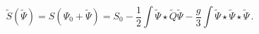 \begin{equation}
\tilde{S} (\tilde{\Psi}) = S (\Psi_0 + \tilde{ \Psi})
= S_0 -\frac{1}{2}\int \tilde{\Psi} \star  \tilde{Q} \tilde{\Psi} -\frac{g}{3}
\int \tilde{\Psi} \star 
\tilde{\Psi} \star \tilde{\Psi}\,.
\label{eq:VSFT-action}
\end{equation}

